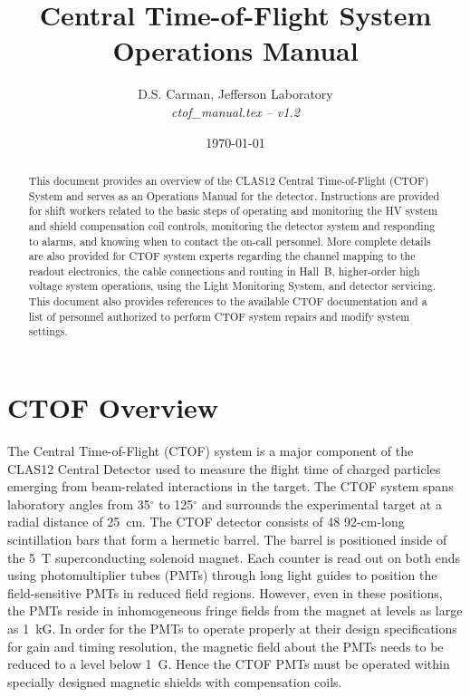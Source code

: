 \documentclass[12pt]{article}
\begin{document}
\title{Central Time-of-Flight System Operations Manual}

\vskip 0.5cm

\author{D.S. Carman, Jefferson Laboratory\\[0.2ex]
{\it ctof\_manual.tex -- v1.2}}

\date \today
%
\maketitle

\begin{abstract}
This document provides an overview of the CLAS12 Central Time-of-Flight (CTOF) System and 
serves as an Operations Manual for the detector. Instructions are provided for shift workers 
related to the basic steps of operating and monitoring the HV system and shield compensation 
coil controls, monitoring the detector system and responding to alarms, and knowing when to 
contact the on-call personnel. More complete details are also provided for CTOF system experts 
regarding the channel mapping to the readout electronics, the cable connections and routing in 
Hall~B, higher-order high voltage system operations, using the Light Monitoring System, and 
detector servicing. This document also provides references to the available CTOF documentation 
and a list of personnel authorized to perform CTOF system repairs and modify system settings.
\end{abstract}

\thispagestyle{empty}

\clearpage

\vfil
\eject

\tableofcontents

\vfil
\eject

\section{CTOF Overview}
\label{intro}

The Central Time-of-Flight (CTOF) system is a major component of the CLAS12 Central Detector used 
to measure the flight time of charged particles emerging from beam-related interactions in the 
target. The CTOF system spans laboratory angles from 35$^\circ$ to 125$^\circ$ and surrounds the 
experimental target at a radial distance of 25~cm. The CTOF detector consists of 48 92-cm-long 
scintillation bars that form a hermetic barrel. The barrel is positioned inside of the 5~T 
superconducting solenoid magnet. Each counter is read out on both ends using photomultiplier 
tubes (PMTs) through long light guides to position the field-sensitive PMTs in reduced field 
regions. However, even in these positions, the PMTs reside in inhomogeneous fringe fields from 
the magnet at levels as large as 1~kG. In order for the PMTs to operate properly at their design 
specifications for gain and timing resolution, the magnetic field about the PMTs needs to be 
reduced to a level below 1~G. Hence the CTOF PMTs must be operated within specially designed 
magnetic shields with compensation coils.
\end{document}
